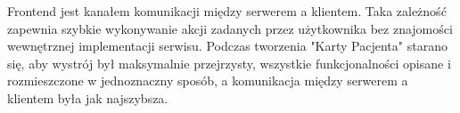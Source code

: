 Frontend jest kanałem komunikacji między serwerem a klientem. Taka zależność zapewnia szybkie wykonywanie akcji zadanych przez użytkownika bez znajomości wewnętrznej implementacji serwisu.
Podczas tworzenia "Karty Pacjenta" starano się, aby wystrój był maksymalnie przejrzysty, wszystkie funkcjonalności opisane i rozmieszczone w jednoznaczny sposób, a komunikacja między serwerem a klientem była jak najszybsza.